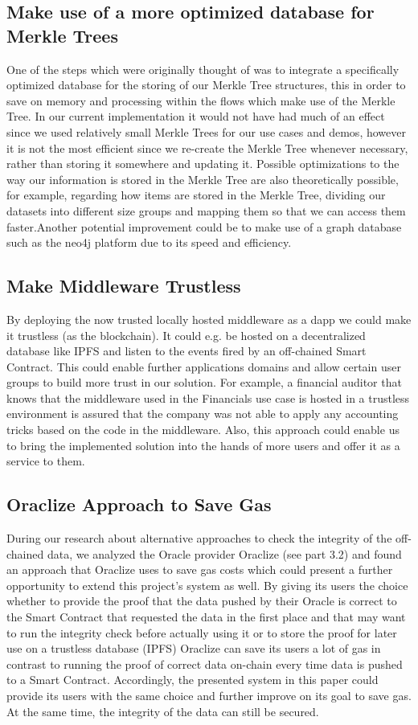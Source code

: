 \subsection{Make use of a more optimized database for Merkle Trees}
One of the steps which were originally thought of was to integrate a specifically optimized database for the storing of our Merkle Tree structures, this in order to save on memory and processing within the flows which make use of the Merkle Tree.
In our current implementation it would not have had much of an effect since we used relatively small Merkle Trees for our use cases and demos, however it is not the most efficient since we re-create the Merkle Tree whenever necessary, rather than storing it somewhere and updating it.
Possible optimizations to the way our information is stored in the Merkle Tree are also theoretically possible, for example, regarding how items are stored in the Merkle Tree, dividing our datasets into different size groups and mapping them so that we can access them faster.Another potential improvement could be to make use of a graph database such as the neo4j platform due to its speed and efficiency.


\subsection{Make Middleware Trustless}
By deploying the now trusted locally hosted middleware as a dapp we could make it trustless (as the blockchain). It could e.g. be hosted on a decentralized database like IPFS and listen to the events fired by an off-chained Smart Contract. This could enable further applications domains and allow certain user groups to build more trust in our solution. For example, a financial auditor that knows that the middleware used in the Financials use case is hosted in a trustless environment is assured that the company was not able to apply any accounting tricks based on the code in the middleware. Also, this approach could enable us to bring the implemented solution into the hands of more users and offer it as a service to them.

\subsection{Oraclize Approach to Save Gas}
During our research about alternative approaches to check the integrity of the off-chained data, we analyzed the Oracle provider Oraclize (see part 3.2) and found an approach that Oraclize uses to save gas costs which could present a further opportunity to extend this project’s system as well. By giving its users the choice whether to provide the proof that the data pushed by their Oracle is correct to the Smart Contract that requested the data in the first place and that may want to run the integrity check before actually using it or to store the proof for later use on a trustless database (IPFS) Oraclize can save its users a lot of gas in contrast to running the proof of correct data on-chain every time data is pushed to a Smart Contract. Accordingly, the presented system in this paper could provide its users with the same choice and further improve on its goal to save gas. At the same time, the integrity of the data can still be secured.

